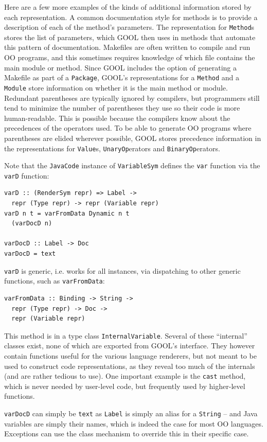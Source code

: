 \documentclass[sigplan,review,anonymous,prologue,dvipsnames]{acmart}
\begin{document}
Here are a few more examples of the kinds of additional information stored by
each representation. A common documentation style for methods is to provide a 
description of each of the method's parameters. The representation for 
\verb|Method|s stores the list of parameters, which GOOL then uses in methods 
that automate this pattern of documentation. Makefiles are often written to 
compile and run OO programs, and this sometimes requires knowledge of which 
file contains the main module or method. Since GOOL includes the option of 
generating a Makefile as part of a \verb|Package|, GOOL's representations for 
a \verb|Method| and a \verb|Module| store information on whether it is 
the main method or module. Redundant parentheses are typically ignored by 
compilers, but programmers still tend to minimize the number of parentheses 
they use so their code is more human-readable. This is possible because the 
compilers know about the precedences of the operators used. To be able to 
generate OO programs where parentheses are elided wherever possible, GOOL 
stores precedence information in the representations for \verb|Value|s, 
\verb|UnaryOp|erators and \verb|BinaryOp|erators.

Note that the \verb|JavaCode| instance of \verb|VariableSym| defines the
\verb|var| function via the \verb|varD| function:
\begin{lstlisting}
varD :: (RenderSym repr) => Label ->
  repr (Type repr) -> repr (Variable repr)
varD n t = varFromData Dynamic n t
  (varDocD n)

varDocD :: Label -> Doc
varDocD = text
\end{lstlisting}
\verb|varD| is generic, i.e. works for all instances, via dispatching to other
generic functions, such as \verb|varFromData|:
\begin{lstlisting}
varFromData :: Binding -> String ->
  repr (Type repr) -> Doc ->
  repr (Variable repr)
\end{lstlisting}
This method is in a type class \verb|InternalVariable|. Several of these
``internal'' classes exist, none of which are exported from GOOL's interface.
They however contain functions useful for the various language renderers, but
not meant to be used to construct code representations, as they reveal too
much of the internals (and are rather tedious to use).  One important
example is the \verb|cast| method, which is never needed by user-level code,
but frequently used by higher-level functions.

\verb|varDocD| can simply be \verb|text| as \verb|Label| is simply an
alias for a \verb|String| -- and Java variables are simply their names,
which is indeed the case for most OO languages. Exceptions can use the
class mechanism to override this in their specific case.
\end{document}
